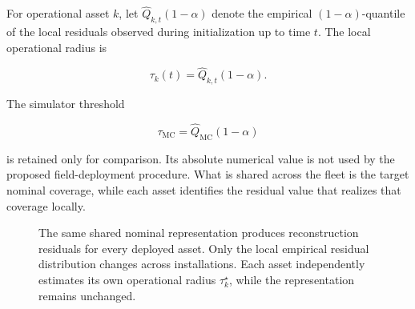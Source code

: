 \documentclass[11pt,a4paper]{article}
\begin{document}
For operational asset $k$, let
$\widehat{Q}_{k,t}(1-\alpha)$ denote the empirical $(1-\alpha)$-quantile of
the local residuals observed during initialization up to time $t$. The local
operational radius is

\begin{equation}
\tau_k(t)=\widehat{Q}_{k,t}(1-\alpha).
\label{eq:adaptive}
\end{equation}

The simulator threshold

\begin{equation}
\tau_{\mathrm{MC}}
=
\widehat{Q}_{\mathrm{MC}}(1-\alpha)
\end{equation}

is retained only for comparison. Its absolute numerical value is
not used by the proposed field-deployment procedure. What is shared across
the fleet is the target nominal coverage, while each asset identifies the
residual value that realizes that coverage locally.
\begin{figure}[H]
\centering


\caption{
The same shared nominal representation produces reconstruction residuals for every deployed asset.
Only the local empirical residual distribution changes across installations.
Each asset independently estimates its own operational radius
$\tau_k^\star$, while the representation remains unchanged.
}
\label{fig:shared_local}
\end{figure}
\end{document}
